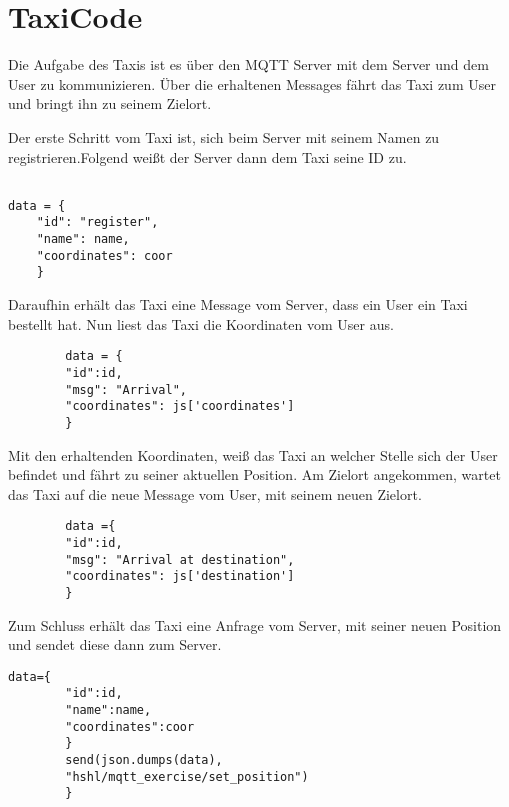 \section{TaxiCode}

Die Aufgabe des Taxis ist es über den MQTT Server mit dem Server und dem User zu kommunizieren. Über die erhaltenen Messages fährt das Taxi zum User und bringt ihn zu seinem Zielort.

Der erste Schritt vom Taxi ist, sich beim Server mit seinem Namen zu registrieren.Folgend weißt der Server dann dem Taxi seine ID zu.

\begin{lstlisting} 

data = {
	"id": "register", 
	"name": name,
	"coordinates": coor
    }  
\end{lstlisting}

Daraufhin erhält das Taxi eine Message vom Server, dass ein User ein Taxi bestellt hat. Nun liest das Taxi die Koordinaten vom User aus. 

\begin{lstlisting} 
        data = {
        "id":id,
        "msg": "Arrival",
        "coordinates": js['coordinates']
        }
\end{lstlisting}

Mit den erhaltenden Koordinaten, weiß das Taxi an welcher Stelle sich der User befindet und fährt zu seiner aktuellen Position. Am Zielort angekommen, wartet das Taxi auf die neue Message vom User, mit seinem neuen Zielort.

\begin{lstlisting} 
        data ={
        "id":id,
        "msg": "Arrival at destination",
        "coordinates": js['destination']
        }
\end{lstlisting}

Zum Schluss erhält das Taxi eine Anfrage vom Server, mit seiner neuen Position und sendet diese dann zum Server.

\begin{lstlisting} 
data={
        "id":id,
        "name":name,
        "coordinates":coor
        }
        send(json.dumps(data),
        "hshl/mqtt_exercise/set_position")
        }
\end{lstlisting}
